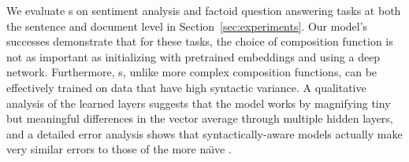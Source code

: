 We evaluate \dan s on sentiment analysis and factoid
question answering tasks at both the sentence and document level in
Section~\ref{sec:experiments}. Our model's successes demonstrate that for these tasks, the choice of composition
function is not as important as initializing with pretrained embeddings and using a deep network. Furthermore, \dan s, unlike more
complex composition functions, can be effectively trained on data that have high
syntactic variance. A qualitative analysis of the learned layers suggests that
the model works by magnifying tiny but meaningful differences in the vector
average through multiple hidden layers, and a detailed error analysis shows that syntactically-aware models actually make very similar errors to those of the more na\"{\i}ve \dan.










